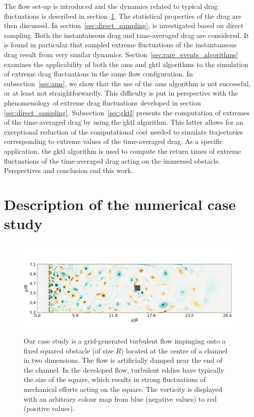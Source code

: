 \documentclass{jfm}
\newcommand{\EL}[1]{{\color{myred}{#1}}}
\begin{document}
The flow set-up is introduced and the dynamics related to typical
drag fluctuations is described in section~\ref{sec:test_flow}.
The statistical properties of the drag are then discussed.
In section~\ref{sec:direct_sampling}, \EL{the phenomenology of  extreme drag fluctuations} is investigated based on direct sampling.
Both the instantaneous drag and time-averaged drag are considered.
It is found in particular that sampled extreme fluctuations of the instantaneous drag result from very similar dynamics. %
Section~\ref{sec:rare_events_algorithms} examines the applicability of both the \ac{ams} and \ac{gktl} algorithms to the simulation of extreme drag fluctuations in the same flow configuration.
In subsection~\ref{sec:ams}, we show that the use of the \ac{ams} algorithm is not successful, or at least not straightforwardly. This difficulty is put in perspective with the phenomenology of extreme drag fluctuations developed in  section \ref{sec:direct_sampling}.
Subsection~\ref{sec:gktl} presents the computation of extremes of the time-averaged drag by using the \ac{gktl} algorithm.
This latter allows for an exceptional reduction of the computational cost needed to simulate trajectories corresponding to extreme values of the time-averaged drag.
As a specific \EL{successful} application, the \ac{gktl} algorithm is used to compute the return times of extreme fluctuations of the time-averaged drag acting on the immersed obstacle.
Perspectives and conclusion end this work.

\section{Description of the numerical case study}
\label{sec:test_flow}

\begin{figure}
	\centering
	\includegraphics[width=\linewidth]{illustr_ecoulement/illustr_ecoulement}
	\caption{Our case study is a grid-generated turbulent flow impinging onto a fixed squared obstacle (of size $R$) located at the centre of a channel in two dimensions. The flow is artificially damped near the end of the channel. In the developed flow, turbulent eddies have typically the size of the square, which results in strong fluctuations of mechanical efforts acting on the square. The vorticity is displayed with an arbitrary colour map from blue (negative values) to red (positive values).}
	\label{fig:illustr_ecoulement}
\end{figure}
\end{document}
